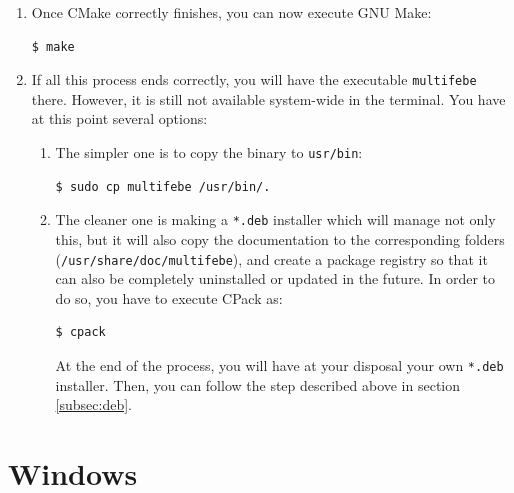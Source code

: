 \documentclass[a4paper,fleqn]{book}
\begin{document}
\begin{enumerate}
    \item Once CMake correctly finishes, you can now execute GNU Make:
\begin{Verbatim}[frame=single, fontsize=\small]
$ make
\end{Verbatim}
    \item If all this process ends correctly, you will have the executable \texttt{multifebe} there. However, it is still not available system-wide in the terminal. You have at this point several options:
    \begin{enumerate}
    \item The simpler one is to copy the binary to \texttt{usr/bin}:
\begin{Verbatim}[frame=single, fontsize=\small]
$ sudo cp multifebe /usr/bin/.
\end{Verbatim}
    \item The cleaner one is making a \texttt{*.deb} installer which will manage not only this, but it will also copy the documentation to the corresponding folders (\texttt{/usr/share/doc/multifebe}), and create a package registry so that it can also be completely uninstalled or updated in the future. In order to do so, you have to execute CPack as:
\begin{Verbatim}[frame=single, fontsize=\small]
$ cpack
\end{Verbatim}
    At the end of the process, you will have at your disposal your own \texttt{*.deb} installer. Then, you can follow the step described above in section \ref{subsec:deb}.
    \end{enumerate}
\end{enumerate}

\section{Windows}
\end{document}
